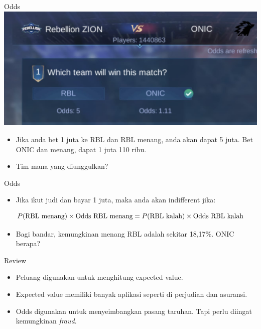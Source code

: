 \documentclass[
  ignorenonframetext,
]{beamer}
\providecommand{\tightlist}{%
  \setlength{\itemsep}{0pt}\setlength{\parskip}{0pt}}\usepackage{longtable,booktabs,array}
\begin{document}
\begin{frame}{Odds}
\label{odds-2}
\includegraphics{bet.jpg}

\begin{itemize}
\item
  Jika anda bet 1 juta ke RBL dan RBL menang, anda akan dapat 5 juta.
  Bet ONIC dan menang, dapat 1 juta 110 ribu.
\item
  Tim mana yang diunggulkan?
\end{itemize}
\end{frame}

\begin{frame}{Odds}
\label{odds-3}
\begin{itemize}[<+->]
\tightlist
\item
  Jika ikut judi dan bayar 1 juta, maka anda akan indifferent jika:
\end{itemize}

\[
P(\text{RBL menang}) \times \text{Odds RBL menang} = \\ P(\text{RBL kalah}) \times \text{Odds RBL kalah}
\]

\begin{itemize}[<+->]
\tightlist
\item
  Bagi bandar, kemungkinan menang RBL adalah sekitar 18,17\%. ONIC
  berapa?
\end{itemize}
\end{frame}

\begin{frame}{Review}
\label{review-1}
\begin{itemize}[<+->]
\item
  Peluang digunakan untuk menghitung expected value.
\item
  Expected value memiliki banyak aplikasi seperti di perjudian dan
  asuransi.
\item
  Odds digunakan untuk menyeimbangkan pasang taruhan. Tapi perlu diingat
  kemungkinan \emph{fraud}.
\end{itemize}
\end{frame}
\end{document}
